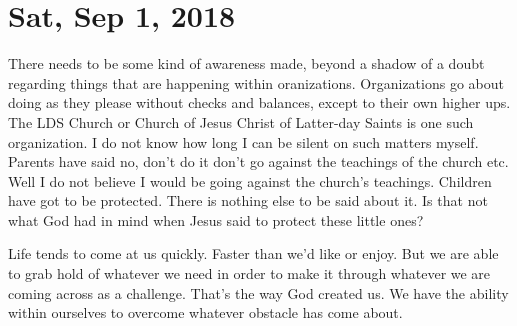 \section{Sat, Sep 1, 2018}

There needs to be some kind of awareness made, beyond a shadow of a doubt regarding
things that are happening within oranizations. Organizations go about doing as they
please without checks and balances, except to their own higher ups. The LDS Church or
Church of Jesus Christ of Latter-day Saints is one such organization. I do not know
how long I can be silent on such matters myself. Parents have said no, don't do it
don't go against the teachings of the church etc. Well I do not believe I would be
going against the church's teachings. Children have got to be protected. There is
nothing else to be said about it. Is that not what God had in mind when Jesus said to
protect these little ones?

Life tends to come at us quickly. Faster than we'd like or enjoy. But we are able to
grab hold of whatever we need in order to make it through whatever we are coming
across as a challenge. That's the way God created us. We have the ability within
ourselves to overcome whatever obstacle has come about.
